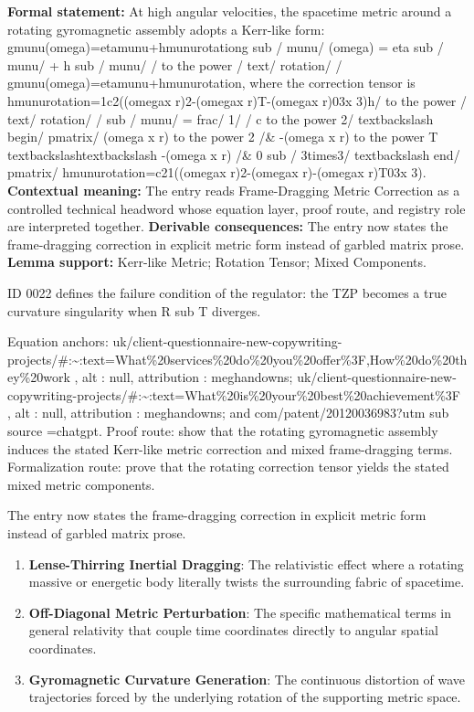 \begingroup\footnotesize\setlength{\emergencystretch}{3em}\sloppy
\textbf{Formal statement:} At high angular velocities, the spacetime metric around a rotating gyromagnetic assembly adopts a Kerr-like form: gmunu(omega)=etamunu+hmunurotationg sub / munu/ (omega) = eta sub / munu/ + h sub / munu/ / to the power / text/ rotation/ / gmunu(omega)=etamunu+hmunurotation, where the correction tensor is hmunurotation=1c2((omegax r)2-(omegax r)T-(omegax r)03x 3)h/ to the power / text/ rotation/ / sub / munu/ = frac/ 1/ / c to the power 2/ textbackslash begin/ pmatrix/ (omega x r) to the power 2 /\& -(omega x r) to the power T textbackslashtextbackslash -(omega x r) /\& 0 sub / 3times3/ textbackslash end/ pmatrix/ hmunurotation=c21((omegax r)2-(omegax r)-(omegax r)T03x 3). \textbf{Contextual meaning:} The entry reads Frame-Dragging Metric Correction as a controlled technical headword whose equation layer, proof route, and registry role are interpreted together. \textbf{Derivable consequences:} The entry now states the frame-dragging correction in explicit metric form instead of garbled matrix prose. \textbf{Lemma support:} Kerr-like Metric; Rotation Tensor; Mixed Components.\par
\endgroup

ID 0022 defines the failure condition of the regulator: the TZP becomes a true curvature singularity when R sub T diverges.

Equation anchors: uk/client-questionnaire-new-copywriting-projects/\#:\textasciitilde{}:text=What\%20services\%20do\%20you\%20offer\%3F,How\%20do\%20they\%20work , alt : null, attribution : meghandowns; uk/client-questionnaire-new-copywriting-projects/\#:\textasciitilde{}:text=What\%20is\%20your\%20best\%20achievement\%3F , alt : null, attribution : meghandowns; and com/patent/20120036983?utm sub source =chatgpt. Proof route: show that the rotating gyromagnetic assembly induces the stated Kerr-like metric correction and mixed frame-dragging terms. Formalization route: prove that the rotating correction tensor yields the stated mixed metric components.

The entry now states the frame-dragging correction in explicit metric form instead of garbled matrix prose.
\endgroup

\begin{enumerate}[leftmargin=1.6em,itemsep=6pt,topsep=4pt]
\item \textbf{Lense-Thirring Inertial Dragging}: The relativistic effect where a rotating massive or energetic body literally twists the surrounding fabric of spacetime.
\item \textbf{Off-Diagonal Metric Perturbation}: The specific mathematical terms in general relativity that couple time coordinates directly to angular spatial coordinates.
\item \textbf{Gyromagnetic Curvature Generation}: The continuous distortion of wave trajectories forced by the underlying rotation of the supporting metric space.
\end{enumerate}

